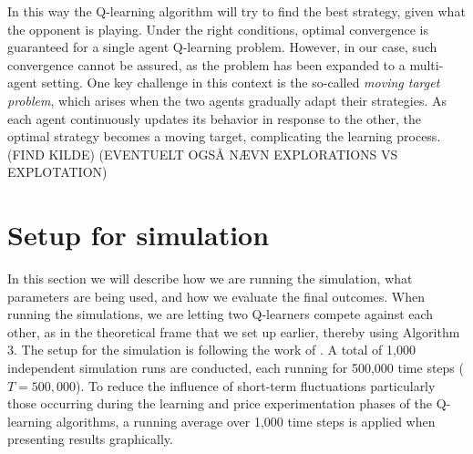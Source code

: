 \documentclass{article}
\begin{document}
In this way the Q-learning algorithm will try to find the best strategy, given what the opponent is playing.
\newline
Under the right conditions, optimal convergence is guaranteed for a single agent Q-learning problem. However, in our case, such convergence cannot be assured, as the problem has been expanded to a multi-agent setting. One key challenge in this context is the so-called \textit{moving target problem}, which arises when the two agents gradually adapt their strategies. As each agent continuously updates its behavior in response to the other, the optimal strategy becomes a moving target, complicating the learning process.
(FIND KILDE) (EVENTUELT OGSÅ NÆVN EXPLORATIONS VS EXPLOTATION)
\section{Setup for simulation}
In this section we will describe how we are running the simulation, what parameters are being used, and how we evaluate the final outcomes.  
\newline
When running the simulations, we are letting two Q-learners compete against each other, as in the theoretical frame that we set up earlier, thereby using Algorithm 3.
\newline
The setup for the simulation is following the work of \cite{Klein2021}. A total of 1,000 independent simulation runs are conducted, each running for 500,000 time steps ($T = 500,000$). To reduce the influence of short-term fluctuations particularly those occurring during the learning and price experimentation phases of the Q-learning algorithms, a running average over 1,000 time steps is applied when presenting results graphically.
\end{document}
